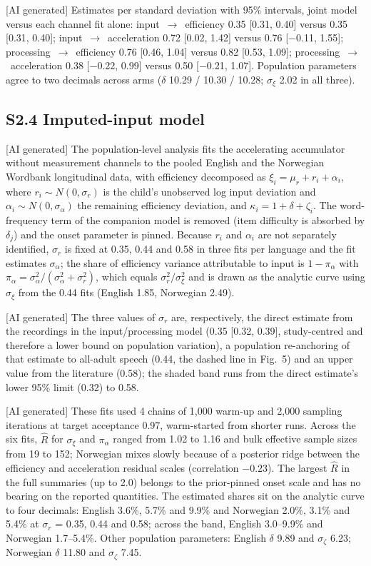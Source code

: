 [AI generated] Estimates per standard deviation with 95\% intervals, joint model
versus each channel fit alone: input~$\to$~efficiency 0.35 [0.31, 0.40] versus 0.35
[0.31, 0.40]; input~$\to$~acceleration 0.72 [0.02, 1.42] versus 0.76 [$-$0.11,
1.55]; processing~$\to$~efficiency 0.76 [0.46, 1.04] versus 0.82 [0.53, 1.09];
processing~$\to$~acceleration 0.38 [$-$0.22, 0.99] versus 0.50 [$-$0.21, 1.07].
Population parameters agree to two decimals across arms ($\delta$ 10.29 / 10.30 /
10.28; $\sigma_\xi$ 2.02 in all three).

\subsection*{S2.4 Imputed-input model}

[AI generated] The population-level analysis fits the accelerating accumulator
without measurement channels to the pooled English and the Norwegian Wordbank
longitudinal data, with efficiency decomposed as $\xi_i = \mu_r + r_i +
\alpha_i$, where $r_i \sim N(0, \sigma_r)$ is the child's unobserved log input
deviation and $\alpha_i \sim N(0, \sigma_\alpha)$ the remaining efficiency
deviation, and $\kappa_i = 1 + \delta + \zeta_i$. The word-frequency term of the
companion model is removed (item difficulty is absorbed by $\delta_j$) and the
onset parameter is pinned. Because $r_i$ and $\alpha_i$ are not separately
identified, $\sigma_r$ is fixed at 0.35, 0.44 and 0.58 in three fits per language
and the fit estimates $\sigma_\alpha$; the share of efficiency variance
attributable to input is $1 - \pi_\alpha$ with $\pi_\alpha = \sigma_\alpha^2 /
(\sigma_\alpha^2 + \sigma_r^2)$, which equals $\sigma_r^2 / \sigma_\xi^2$ and is
drawn as the analytic curve using $\sigma_\xi$ from the 0.44 fits (English 1.85,
Norwegian 2.49).

[AI generated] The three values of $\sigma_r$ are, respectively, the direct
estimate from the recordings in the input/processing model (0.35 [0.32, 0.39],
study-centred and therefore a lower bound on population variation), a population
re-anchoring of that estimate to all-adult speech (0.44, the dashed line in
Fig.~5) and an upper value from the literature (0.58); the shaded band runs from
the direct estimate's lower 95\% limit (0.32) to 0.58.

[AI generated] These fits used 4 chains of 1,000 warm-up and 2,000 sampling
iterations at target acceptance 0.97, warm-started from shorter runs. Across the
six fits, $\hat R$ for $\sigma_\xi$ and $\pi_\alpha$ ranged from 1.02 to 1.16 and
bulk effective sample sizes from 19 to 152; Norwegian mixes slowly because of a
posterior ridge between the efficiency and acceleration residual scales
(correlation $-0.23$). The largest $\hat R$ in the full summaries (up to 2.0)
belongs to the prior-pinned onset scale and has no bearing on the reported
quantities. The estimated shares sit on the analytic curve to four decimals:
English 3.6\%, 5.7\% and 9.9\% and Norwegian 2.0\%, 3.1\% and 5.4\% at
$\sigma_r$ = 0.35, 0.44 and 0.58; across the band, English 3.0--9.9\% and
Norwegian 1.7--5.4\%. Other population parameters: English $\delta$ 9.89 and
$\sigma_\zeta$ 6.23; Norwegian $\delta$ 11.80 and $\sigma_\zeta$ 7.45.

